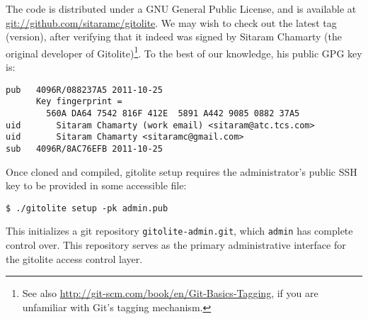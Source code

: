 The code is distributed under a GNU General Public License, and is available at
\url{git://github.com/sitaramc/gitolite}. We may wish to check out the latest
tag (version), after verifying that it indeed was signed by Sitaram Chamarty
(the original developer of Gitolite)\footnote{See also
\url{http://git-scm.com/book/en/Git-Basics-Tagging}, if you are unfamiliar with
Git's tagging mechanism.}. To the best of our knowledge, his public GPG key is:

\begin{lstlisting}
pub   4096R/088237A5 2011-10-25
      Key fingerprint =
        560A DA64 7542 816F 412E  5891 A442 9085 0882 37A5
uid       Sitaram Chamarty (work email) <sitaram@atc.tcs.com>
uid       Sitaram Chamarty <sitaramc@gmail.com>
sub   4096R/8AC76EFB 2011-10-25
\end{lstlisting}

Once cloned and compiled, gitolite setup requires the administrator's public
SSH key to be provided in some accessible file:

\begin{lstlisting}
$ ./gitolite setup -pk admin.pub
\end{lstlisting}

This initializes a git repository \texttt{gitolite-admin.git}, which
\texttt{admin} has complete control over. This repository serves as the primary
administrative interface for the gitolite access control layer.
